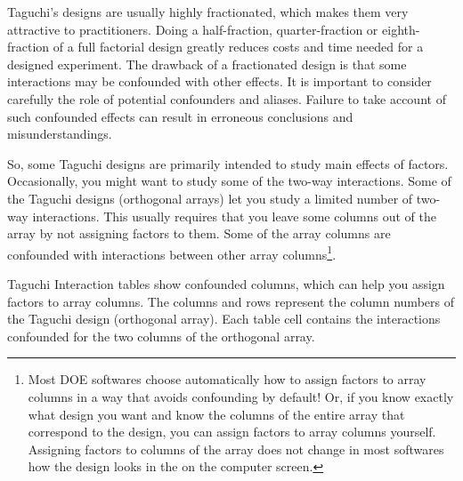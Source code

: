 	Taguchi's designs are usually highly fractionated, which makes them very attractive to practitioners. Doing a half-fraction, quarter-fraction or eighth-fraction of a full factorial design greatly reduces costs and time needed for a designed experiment. The drawback of a fractionated design is that some interactions may be confounded with other effects. It is important to consider carefully the role of potential confounders and aliases. Failure to take account of such confounded effects can result in erroneous conclusions and misunderstandings.
	
	So, some Taguchi designs are primarily intended to study main effects of factors. Occasionally, you might want to study some of the two-way interactions. Some of the Taguchi designs (orthogonal arrays) let you study a limited number of two-way interactions. This usually requires that you leave some columns out of the array by not assigning factors to them. Some of the array columns are confounded with interactions between other array columns\footnote{Most DOE softwares choose automatically how to assign factors to array columns in a way that avoids confounding by default! Or, if you know exactly what design you want and know the columns of the entire array that correspond to the design, you can assign factors to array columns yourself. Assigning factors to columns of the array does not change in most softwares how the design looks in the on the computer screen.}.
	
	Taguchi Interaction tables show confounded columns, which can help you assign factors to array columns. The columns and rows represent the column numbers of the Taguchi design (orthogonal array). Each table cell contains the interactions confounded for the two columns of the orthogonal array.

